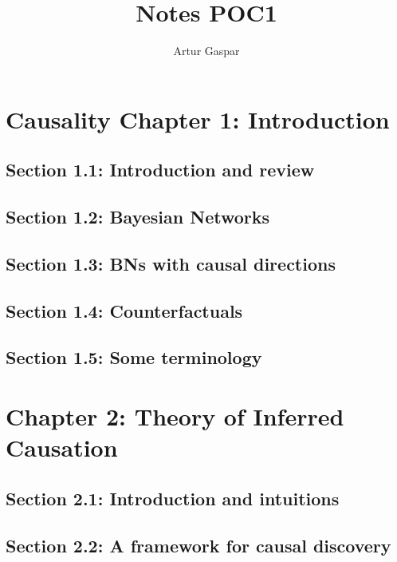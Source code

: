 \documentclass[oneside]{book}
\title{Notes POC1}
\author{Artur Gaspar}
\begin{document}
\maketitle
\tableofcontents

\chapter{Causality Chapter 1: Introduction}

\section{Section 1.1: Introduction and review}



\section{Section 1.2: Bayesian Networks}



\section{Section 1.3: BNs with causal directions}



\section{Section 1.4: Counterfactuals}



\section{Section 1.5: Some terminology}



\chapter{Chapter 2: Theory of Inferred Causation}

\section{Section 2.1: Introduction and intuitions}



\section{Section 2.2: A framework for causal discovery}
\end{document}
